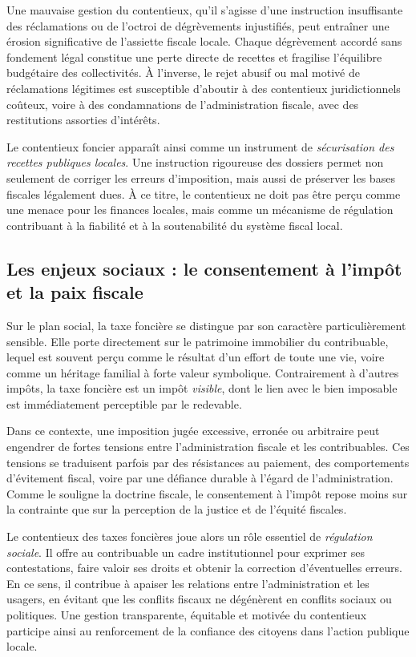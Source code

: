 \documentclass[Cours_contentieuxTF2026.tex]{subfiles}
\begin{document}
\noindent Une mauvaise gestion du contentieux, qu’il s’agisse d’une instruction insuffisante des réclamations
ou de l’octroi de dégrèvements injustifiés, peut entraîner une érosion significative de l’assiette
fiscale locale. Chaque dégrèvement accordé sans fondement légal constitue une perte directe de
recettes et fragilise l’équilibre budgétaire des collectivités. À l’inverse, le rejet abusif ou mal motivé
de réclamations légitimes est susceptible d’aboutir à des contentieux juridictionnels coûteux, voire à
des condamnations de l’administration fiscale, avec des restitutions assorties d’intérêts.

\noindent Le contentieux foncier apparaît ainsi comme un instrument de \emph{sécurisation des recettes
	publiques locales}. Une instruction rigoureuse des dossiers permet non seulement de corriger les
erreurs d’imposition, mais aussi de préserver les bases fiscales légalement dues. À ce titre, le
contentieux ne doit pas être perçu comme une menace pour les finances locales, mais comme un
mécanisme de régulation contribuant à la fiabilité et à la soutenabilité du système fiscal local.

\subsection*{Les enjeux sociaux : le consentement à l’impôt et la paix fiscale}

Sur le plan social, la taxe foncière se distingue par son caractère particulièrement sensible. Elle
porte directement sur le patrimoine immobilier du contribuable, lequel est souvent perçu comme le
résultat d’un effort de toute une vie, voire comme un héritage familial à forte valeur symbolique.
Contrairement à d’autres impôts, la taxe foncière est un impôt \emph{visible}, dont le lien avec le bien
imposable est immédiatement perceptible par le redevable.

\noindent Dans ce contexte, une imposition jugée excessive, erronée ou arbitraire peut engendrer de fortes
tensions entre l’administration fiscale et les contribuables. Ces tensions se traduisent parfois par
des résistances au paiement, des comportements d’évitement fiscal, voire par une défiance durable à
l’égard de l’administration. Comme le souligne la doctrine fiscale, le consentement à l’impôt repose
moins sur la contrainte que sur la perception de la justice et de l’équité fiscales.

\noindent Le contentieux des taxes foncières joue alors un rôle essentiel de \emph{régulation sociale}. Il offre
au contribuable un cadre institutionnel pour exprimer ses contestations, faire valoir ses droits et
obtenir la correction d’éventuelles erreurs. En ce sens, il contribue à apaiser les relations entre
l’administration et les usagers, en évitant que les conflits fiscaux ne dégénèrent en conflits sociaux
ou politiques. Une gestion transparente, équitable et motivée du contentieux participe ainsi au
renforcement de la confiance des citoyens dans l’action publique locale.
\end{document}
